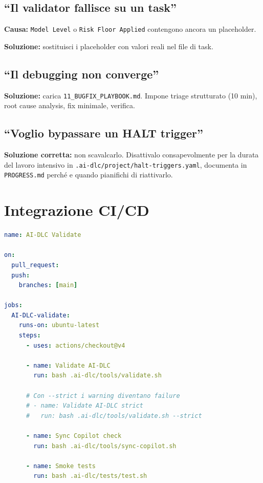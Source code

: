 \subsection*{``Il validator fallisce su un task''}

\textbf{Causa:} \texttt{Model Level} o \texttt{Risk Floor Applied} contengono ancora un placeholder.

\textbf{Soluzione:} sostituisci i placeholder con valori reali nel file di task.

\subsection*{``Il debugging non converge''}

\textbf{Soluzione:} carica \texttt{11\_BUGFIX\_PLAYBOOK.md}. Impone triage strutturato (10 min), root cause analysis, fix minimale, verifica.

\subsection*{``Voglio bypassare un HALT trigger''}

\textbf{Soluzione corretta:} non scavalcarlo. Disattivalo consapevolmente per la durata del lavoro intensivo in \texttt{.ai-dlc/project/halt-triggers.yaml}, documenta in \texttt{PROGRESS.md} perché e quando pianifichi di riattivarlo.

\section{Integrazione CI/CD}
\label{sec:16-cicd}

\begin{lstlisting}[language=yaml,caption={GitHub Actions per validazione AI-DLC}]
name: AI-DLC Validate

on:
  pull_request:
  push:
    branches: [main]

jobs:
  AI-DLC-validate:
    runs-on: ubuntu-latest
    steps:
      - uses: actions/checkout@v4

      - name: Validate AI-DLC
        run: bash .ai-dlc/tools/validate.sh

      # Con --strict i warning diventano failure
      # - name: Validate AI-DLC strict
      #   run: bash .ai-dlc/tools/validate.sh --strict

      - name: Sync Copilot check
        run: bash .ai-dlc/tools/sync-copilot.sh

      - name: Smoke tests
        run: bash .ai-dlc/tests/test.sh
\end{lstlisting}

